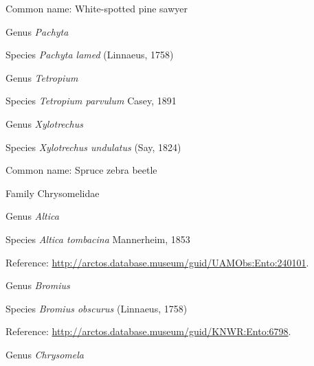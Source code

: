 \documentclass[9pt, article]{memoir}
\begin{document}
\begin{multicols}{2}
Common name: White-spotted pine sawyer

\vspace{6pt}\noindent\hspace{30pt}Genus \textit{Pachyta}


\vspace{6pt}\noindent\hspace{36pt}Species \textit{Pachyta lamed} (Linnaeus, 1758)


\vspace{6pt}\noindent\hspace{30pt}Genus \textit{Tetropium}


\vspace{6pt}\noindent\hspace{36pt}Species \textit{Tetropium parvulum} Casey, 1891


\vspace{6pt}\noindent\hspace{30pt}Genus \textit{Xylotrechus}


\vspace{6pt}\noindent\hspace{36pt}Species \textit{Xylotrechus undulatus} (Say, 1824)


Common name: Spruce zebra beetle

\vspace{6pt}\noindent\hspace{24pt}Family Chrysomelidae


\vspace{6pt}\noindent\hspace{30pt}Genus \textit{Altica}


\vspace{6pt}\noindent\hspace{36pt}Species \textit{Altica tombacina} Mannerheim, 1853


Reference: 
\url{http://arctos.database.museum/guid/UAMObs:Ento:240101}.

\vspace{6pt}\noindent\hspace{30pt}Genus \textit{Bromius}


\vspace{6pt}\noindent\hspace{36pt}Species \textit{Bromius obscurus} (Linnaeus, 1758)


Reference: 
\url{http://arctos.database.museum/guid/KNWR:Ento:6798}.

\vspace{6pt}\noindent\hspace{30pt}Genus \textit{Chrysomela}



\end{multicols}
\end{document}
